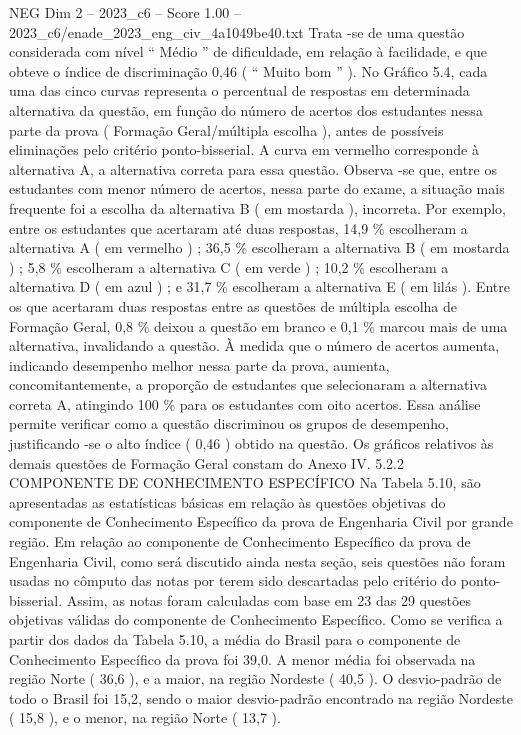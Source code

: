 \begin{textsample}{NEG Dim 2 – 2023\_c6 – Score 1.00 – 2023\_c6/enade\_2023\_eng\_civ\_4a1049be40.txt}
Trata -se de uma questão considerada com nível “ Médio ” de dificuldade, em relação à facilidade, e que obteve o índice de discriminação 0,46 ( “ Muito bom ” ).
No Gráfico 5.4, cada uma das cinco curvas representa o percentual de respostas em determinada alternativa da questão, em função do número de acertos dos estudantes nessa parte da prova ( Formação Geral/múltipla escolha ), antes de possíveis eliminações pelo critério ponto-bisserial.
A curva em vermelho corresponde à alternativa A, a alternativa correta para essa questão.
Observa -se que, entre os estudantes com menor número de acertos, nessa parte do exame, a situação mais frequente foi a escolha da alternativa B ( em mostarda ), incorreta.
Por exemplo, entre os estudantes que acertaram até duas respostas, 14,9 \% escolheram a alternativa A ( em vermelho ) ; 36,5 \% escolheram a alternativa B ( em mostarda ) ; 5,8 \% escolheram a alternativa C ( em verde ) ; 10,2 \% escolheram a alternativa D ( em azul ) ; e 31,7 \% escolheram a alternativa E ( em lilás ).
Entre os que acertaram duas respostas entre as questões de múltipla escolha de Formação Geral, 0,8 \% deixou a questão em branco e 0,1 \% marcou mais de uma alternativa, invalidando a questão.
À medida que o número de acertos aumenta, indicando desempenho melhor nessa parte da prova, aumenta, concomitantemente, a proporção de estudantes que selecionaram a alternativa correta A, atingindo 100 \% para os estudantes com oito acertos.
Essa análise permite verificar como a questão discriminou os grupos de desempenho, justificando -se o alto índice ( 0,46 ) obtido na questão.
Os gráficos relativos às demais questões de Formação Geral constam do Anexo IV. 5.2.2 COMPONENTE DE CONHECIMENTO ESPECÍFICO Na Tabela 5.10, são apresentadas as estatísticas básicas em relação às questões objetivas do componente de Conhecimento Específico da prova de Engenharia Civil por grande região.
Em relação ao componente de Conhecimento Específico da prova de Engenharia Civil, como será discutido ainda nesta seção, seis questões não foram usadas no cômputo das notas por terem sido descartadas pelo critério do ponto-bisserial.
Assim, as notas foram calculadas com base em 23 das 29 questões objetivas válidas do componente de Conhecimento Específico.
Como se verifica a partir dos dados da Tabela 5.10, a média do Brasil para o componente de Conhecimento Específico da prova foi 39,0.
A menor média foi observada na região Norte ( 36,6 ), e a maior, na região Nordeste ( 40,5 ).
O desvio-padrão de todo o Brasil foi 15,2, sendo o maior desvio-padrão encontrado na região Nordeste ( 15,8 ), e o menor, na região Norte ( 13,7 ).

\end{textsample}
